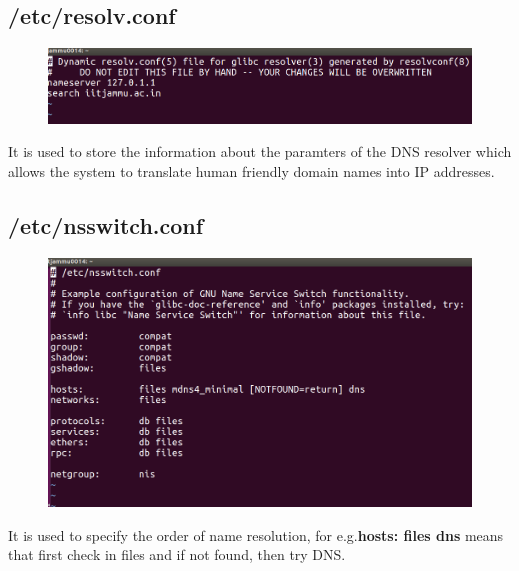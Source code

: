 \documentclass[]{report}
\begin{document}
\subsection{/etc/resolv.conf}
\begin{figure}[H]
	\vspace{0pt}
	\includegraphics[width=\linewidth, keepaspectratio]{Snapshots/exe1/resolv_conf.png}
\end{figure}
It is used to store the information about the paramters of the DNS resolver which allows the system to translate human friendly domain names into IP addresses.

\subsection{/etc/nsswitch.conf}
\begin{figure}[H]
	\vspace{0pt}
	\includegraphics[width=\linewidth, keepaspectratio]{Snapshots/exe1/nsswitch.png}
\end{figure}
It is used to specify the order of name resolution, for e.g.\textbf{hosts: files dns} means that first check in files and if not found, then try DNS. 


\end{document}

